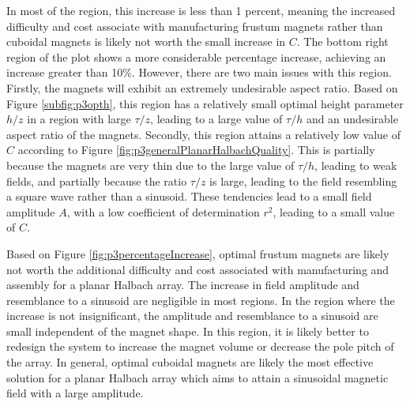 In most of the region, this increase is less than 1 percent, meaning the increased difficulty and cost associate with manufacturing frustum magnets rather than cuboidal magnets is likely not worth the small increase in \(C\). The bottom right region of the plot shows a more considerable percentage increase, achieving an increase greater than 10\%. However, there are two main issues with this region. Firstly, the magnets will exhibit an extremely undesirable aspect ratio. Based on Figure \ref{subfig:p3opth}, this region has a relatively small optimal height parameter \(h/z\) in a region with large \(\tau/z\), leading to a large value of \(\tau/h\) and an undesirable aspect ratio of the magnets. Secondly, this region attains a relatively low value of \(C\) according to Figure \ref{fig:p3generalPlanarHalbachQuality}. This is partially because the magnets are very thin due to the large value of \(\tau/h\), leading to weak fields, and partially because the ratio \(\tau/z\) is large, leading to the field resembling a square wave rather than a sinusoid. These tendencies lead to a small field amplitude \(A\), with a low coefficient of determination \(r^2\), leading to a small value of \(C\).

Based on Figure \ref{fig:p3percentageIncrease}, optimal frustum magnets are likely not worth the additional difficulty and cost associated with manufacturing and assembly for a planar Halbach array. The increase in field amplitude and resemblance to a sinusoid are negligible in most regions. In the region where the increase is not insignificant, the amplitude and resemblance to a sinusoid are small independent of the magnet shape. In this region, it is likely better to redesign the system to increase the magnet volume or decrease the pole pitch of the array. In general, optimal cuboidal magnets are likely the most effective solution for a planar Halbach array which aims to attain a sinusoidal magnetic field with a large amplitude.